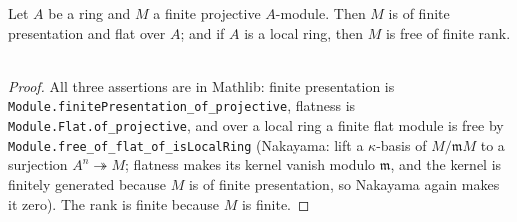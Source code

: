 \begin{lemma}
\label{lem:pc-finite-projective-module}
Let $A$ be a ring and $M$ a finite projective $A$-module.  Then $M$ is
of finite presentation and flat over $A$; and if $A$ is a local ring,
then $M$ is free of finite rank.
\mathlibok\ 
\end{lemma}
\begin{proof}
All three assertions are in Mathlib: finite presentation is
\texttt{Module.finitePresentation\_of\_projective}, flatness is
\texttt{Module.Flat.of\_projective}, and over a local ring a finite
flat module is free by
\texttt{Module.free\_of\_flat\_of\_isLocalRing} (Nakayama: lift a
$\kappa$-basis of $M/\mathfrak mM$ to a surjection
$A^n\twoheadrightarrow M$; flatness makes its kernel vanish modulo
$\mathfrak m$, and the kernel is finitely generated because $M$ is of
finite presentation, so Nakayama again makes it zero).  The rank is
finite because $M$ is finite.
\end{proof}

